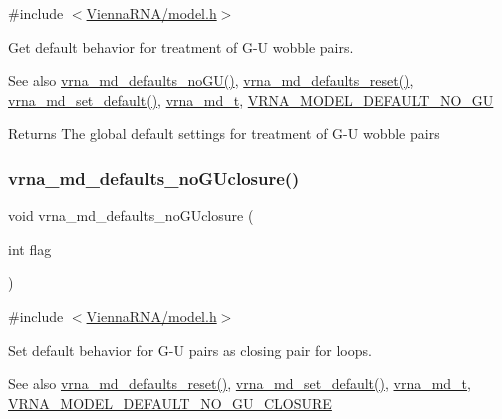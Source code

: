 {\ttfamily \#include $<$\mbox{\hyperlink{model_8h}{Vienna\+R\+N\+A/model.\+h}}$>$}



Get default behavior for treatment of G-\/U wobble pairs. 

\begin{DoxySeeAlso}{See also}
\mbox{\hyperlink{group__model__details_ga98218f85c7a957a1d1ddf4627fdf5a39}{vrna\+\_\+md\+\_\+defaults\+\_\+no\+G\+U()}}, \mbox{\hyperlink{group__model__details_ga70834424cf804d149937de89f80ceb45}{vrna\+\_\+md\+\_\+defaults\+\_\+reset()}}, \mbox{\hyperlink{group__model__details_ga8ac6ff84936282436f822644bf841f66}{vrna\+\_\+md\+\_\+set\+\_\+default()}}, \mbox{\hyperlink{group__model__details_ga1f8a10e12a0a1915f2a4eff0b28ea17c}{vrna\+\_\+md\+\_\+t}}, \mbox{\hyperlink{group__model__details_ga34702f7d14d38b877ba8e475281e97e2}{V\+R\+N\+A\+\_\+\+M\+O\+D\+E\+L\+\_\+\+D\+E\+F\+A\+U\+L\+T\+\_\+\+N\+O\+\_\+\+GU}} 
\end{DoxySeeAlso}
\begin{DoxyReturn}{Returns}
The global default settings for treatment of G-\/U wobble pairs 
\end{DoxyReturn}
\mbox{\label{group__model__details_gade5b9951d71ca2fb357a4e6c0c18ccd1}} 
\subsubsection{\texorpdfstring{vrna\_md\_defaults\_noGUclosure()}{vrna\_md\_defaults\_noGUclosure()}}
{\footnotesize\ttfamily void vrna\+\_\+md\+\_\+defaults\+\_\+no\+G\+Uclosure (\begin{DoxyParamCaption}\item[{int}]{flag }\end{DoxyParamCaption})}



{\ttfamily \#include $<$\mbox{\hyperlink{model_8h}{Vienna\+R\+N\+A/model.\+h}}$>$}



Set default behavior for G-\/U pairs as closing pair for loops. 

\begin{DoxySeeAlso}{See also}
\mbox{\hyperlink{group__model__details_ga70834424cf804d149937de89f80ceb45}{vrna\+\_\+md\+\_\+defaults\+\_\+reset()}}, \mbox{\hyperlink{group__model__details_ga8ac6ff84936282436f822644bf841f66}{vrna\+\_\+md\+\_\+set\+\_\+default()}}, \mbox{\hyperlink{group__model__details_ga1f8a10e12a0a1915f2a4eff0b28ea17c}{vrna\+\_\+md\+\_\+t}}, \mbox{\hyperlink{group__model__details_ga5308de46faaca4b9fd16045864901ee7}{V\+R\+N\+A\+\_\+\+M\+O\+D\+E\+L\+\_\+\+D\+E\+F\+A\+U\+L\+T\+\_\+\+N\+O\+\_\+\+G\+U\+\_\+\+C\+L\+O\+S\+U\+RE}} 
\end{DoxySeeAlso}

